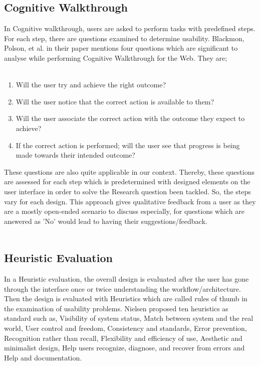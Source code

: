 \subsection{Cognitive Walkthrough}

In Cognitive walkthrough, users are asked to perform tasks with predefined steps. For each step, there are questions examined to determine usability. Blackmon, Polson, et al. in their paper \cite{blackmon2002cognitive} mentions four questions which are significant to analyse while performing Cognitive Walkthrough for the Web. They are;  \\ \\

\begin{enumerate}
	\item Will the user try and achieve the right outcome?	
	\item Will the user notice that the correct action is available to them?
	\item Will the user associate the correct action with the outcome they expect to achieve?
	\item If the correct action is performed; will the user see that progress is being made towards their intended outcome?
\end{enumerate}

These questions are also quite applicable in our context. Thereby, these questions are assessed for each step which is predetermined with designed elements on the user interface in order to solve the Research question been tackled. So, the steps vary for each design. This approach gives qualitative feedback from a user as they are a mostly open-ended scenario to discuss especially, for questions which are answered as 'No' would lead to having their suggestions/feedback. \\ \\

\subsection{Heuristic Evaluation}

In a Heuristic evaluation, the overall design is evaluated after the user has gone through the interface once or twice understanding the workflow/architecture. Then the design is evaluated with Heuristics which are called rules of thumb in the examination of usability problems. Nielsen proposed ten heuristics as standard such as, Visibility of system status, Match between system and the real world, User control and freedom, Consistency and standards, Error prevention, Recognition rather than recall, Flexibility and efficiency of use, Aesthetic and minimalist design, Help users recognize, diagnose, and recover from errors and Help and documentation. \\ \\

